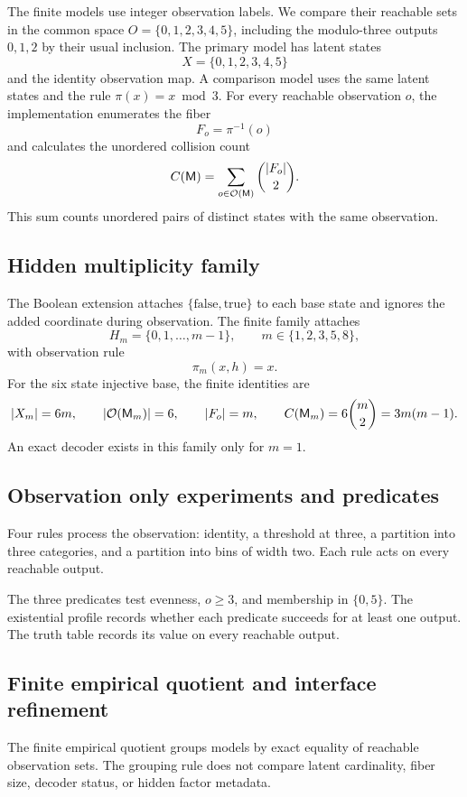 The finite models use integer observation labels. We compare their reachable sets in the common space \(O=\{0,1,2,3,4,5\}\), including the modulo-three outputs \(0,1,2\) by their usual inclusion. The primary model has latent states
\[
X=\{0,1,2,3,4,5\}
\]
and the identity observation map. A comparison model uses the same latent states and the rule \(\pi(x)=x\bmod 3\). For every reachable observation \(o\), the implementation enumerates the fiber
\[
F_o=\pi^{-1}(o)
\]
and calculates the unordered collision count
\[
C(\mathsf M)=\sum_{o\in\mathcal O(\mathsf M)}\binom{|F_o|}{2}.
\]
This sum counts unordered pairs of distinct states with the same observation.

\subsection{Hidden multiplicity family}

The Boolean extension attaches \(\{\mathrm{false},\mathrm{true}\}\) to each base state and ignores the added coordinate during observation. The finite family attaches
\[
H_m=\{0,1,\ldots,m-1\},
\qquad
m\in\{1,2,3,5,8\},
\]
with observation rule
\[
\pi_m(x,h)=x.
\]
For the six state injective base, the finite identities are
\[
|X_m|=6m,
\qquad
|\mathcal O(\mathsf M_m)|=6,
\qquad
|F_o|=m,
\qquad
C(\mathsf M_m)=6\binom{m}{2}=3m(m-1).
\]
An exact decoder exists in this family only for \(m=1\).

\subsection{Observation only experiments and predicates}

Four rules process the observation: identity, a threshold at three, a partition into three categories, and a partition into bins of width two. Each rule acts on every reachable output.

The three predicates test evenness, \(o\geq 3\), and membership in \(\{0,5\}\). The existential profile records whether each predicate succeeds for at least one output. The truth table records its value on every reachable output.

\subsection{Finite empirical quotient and interface refinement}

The finite empirical quotient groups models by exact equality of reachable observation sets. The grouping rule does not compare latent cardinality, fiber size, decoder status, or hidden factor metadata.

